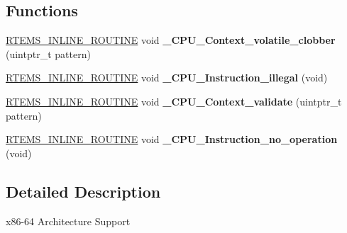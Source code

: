 \subsection*{Functions}
\begin{DoxyCompactItemize}
\item 
\mbox{\label{group__RTEMSScoreCPUx86-64_gaeb1ddd8f84f82b13fad2a05a3e7d0ab7}} 
\mbox{\hyperlink{group__RTEMSScoreBaseDefs_gac216239df231d5dbd15e3520b0b9313f}{R\+T\+E\+M\+S\+\_\+\+I\+N\+L\+I\+N\+E\+\_\+\+R\+O\+U\+T\+I\+NE}} void {\bfseries \+\_\+\+C\+P\+U\+\_\+\+Context\+\_\+volatile\+\_\+clobber} (uintptr\+\_\+t pattern)
\item 
\mbox{\label{group__RTEMSScoreCPUx86-64_ga07618c93359f2485af2e98a96b330208}} 
\mbox{\hyperlink{group__RTEMSScoreBaseDefs_gac216239df231d5dbd15e3520b0b9313f}{R\+T\+E\+M\+S\+\_\+\+I\+N\+L\+I\+N\+E\+\_\+\+R\+O\+U\+T\+I\+NE}} void {\bfseries \+\_\+\+C\+P\+U\+\_\+\+Instruction\+\_\+illegal} (void)
\item 
\mbox{\label{group__RTEMSScoreCPUx86-64_gaae027d9a906bb67d38ebd7a9104b976b}} 
\mbox{\hyperlink{group__RTEMSScoreBaseDefs_gac216239df231d5dbd15e3520b0b9313f}{R\+T\+E\+M\+S\+\_\+\+I\+N\+L\+I\+N\+E\+\_\+\+R\+O\+U\+T\+I\+NE}} void {\bfseries \+\_\+\+C\+P\+U\+\_\+\+Context\+\_\+validate} (uintptr\+\_\+t pattern)
\item 
\mbox{\label{group__RTEMSScoreCPUx86-64_gab683a0a37a089e2a0fd3c356836d5499}} 
\mbox{\hyperlink{group__RTEMSScoreBaseDefs_gac216239df231d5dbd15e3520b0b9313f}{R\+T\+E\+M\+S\+\_\+\+I\+N\+L\+I\+N\+E\+\_\+\+R\+O\+U\+T\+I\+NE}} void {\bfseries \+\_\+\+C\+P\+U\+\_\+\+Instruction\+\_\+no\+\_\+operation} (void)
\end{DoxyCompactItemize}


\subsection{Detailed Description}
x86-\/64 Architecture Support 

